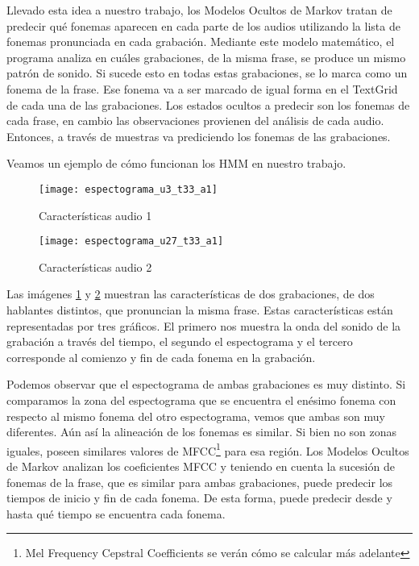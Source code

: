 Llevado esta idea a nuestro trabajo, los Modelos Ocultos de Markov tratan de predecir qué fonemas aparecen en cada parte de los audios utilizando la lista de fonemas pronunciada en cada grabación. Mediante este modelo matemático, el programa analiza en cuáles grabaciones, de la misma frase, se produce un mismo patrón de sonido. Si sucede esto en todas estas grabaciones, se lo marca como un fonema de la frase. Ese fonema va a ser marcado de igual forma en el TextGrid de cada una de las grabaciones. Los estados ocultos a predecir son los fonemas de cada frase, en cambio las observaciones provienen del análisis de cada audio. Entonces, a través de muestras va prediciendo los fonemas de las grabaciones.

Veamos un ejemplo de cómo funcionan los HMM en nuestro trabajo. 

\begin{figure}[H]
	\centering
	\texttt{[image: espectograma\_u3\_t33\_a1]} 
	\caption{Características audio 1}
	\label{car_a1}
\end{figure}

\begin{figure}[H]
	\centering
	\texttt{[image: espectograma\_u27\_t33\_a1]} 
	\caption{Características audio 2}
	\label{car_a2}
\end{figure}

Las imágenes \ref{car_a1} y \ref{car_a2} muestran las características de dos grabaciones, de dos hablantes distintos, que pronuncian la misma frase. Estas características están representadas por tres gráficos. El primero nos muestra la onda del sonido de la grabación a través del tiempo, el segundo el espectograma y el tercero corresponde al comienzo y fin de cada fonema en la grabación. 

Podemos observar que el espectograma de ambas grabaciones es muy distinto. Si comparamos la zona del espectograma que se encuentra el enésimo fonema con respecto al mismo fonema del otro espectograma, vemos que ambas son muy diferentes. Aún así la alineación de los fonemas es similar. Si bien no son zonas iguales, poseen similares valores de MFCC\footnote{Mel Frequency Cepstral Coefficients se verán cómo se calcular más adelante} para esa región. Los Modelos Ocultos de Markov analizan los coeficientes MFCC y teniendo en cuenta la sucesión de fonemas de la frase, que es similar para ambas grabaciones, puede predecir los tiempos de inicio y fin de cada fonema. De esta forma, puede predecir desde y hasta qué tiempo se encuentra cada fonema.
\\

